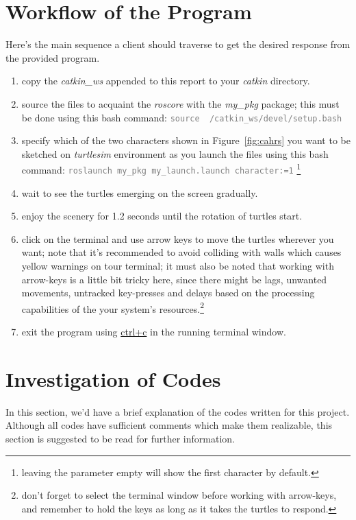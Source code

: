 \documentclass[conference]{IEEEtran}
\newcommand{\command}[1]{\textcolor{gray}{\footnotesize \texttt{#1}}}
\begin{document}
\section{Workflow of the Program}
Here's the main sequence a client should traverse to get the desired response from the provided program.
\begin{enumerate}
    \item copy the \textit{catkin\_ws} appended to this report to your \textit{catkin} directory.
    \item source the files to acquaint the \textit{roscore} with the \textit{my\_pkg} package; this must be done using this bash command: \command{source ~/catkin\_ws/devel/setup.bash}
    \item specify which of the two characters shown in Figure~\ref{fig:cahrs} you want to be sketched on \textit{turtlesim} environment as you launch the files using this bash command: \command{roslaunch my\_pkg my\_launch.launch character:=1} \footnote{leaving the parameter empty will show the first character by default.}
    \item wait to see the turtles emerging on the screen gradually.
    \item enjoy the scenery for 1.2 seconds until the rotation of turtles start.
    \item click on the terminal and use arrow keys to move the turtles wherever you want; note that it's recommended to avoid colliding with walls which causes yellow warnings on tour terminal; it must also be noted that working with arrow-keys is a little bit tricky here, since there might be lags, unwanted movements, untracked key-presses and delays based on the processing capabilities of the your system's resources.\footnote{don't forget to select the terminal window before working with arrow-keys, and remember to hold the keys as long as it takes the turtles to respond.}
    \item exit the program using \underline{ctrl+c} in the running terminal window.
\end{enumerate}

\section{Investigation of Codes}
In this section, we'd have a brief explanation of the codes written for this project. Although all codes have sufficient comments which make them realizable, this section is suggested to be read for further information.
\end{document}
